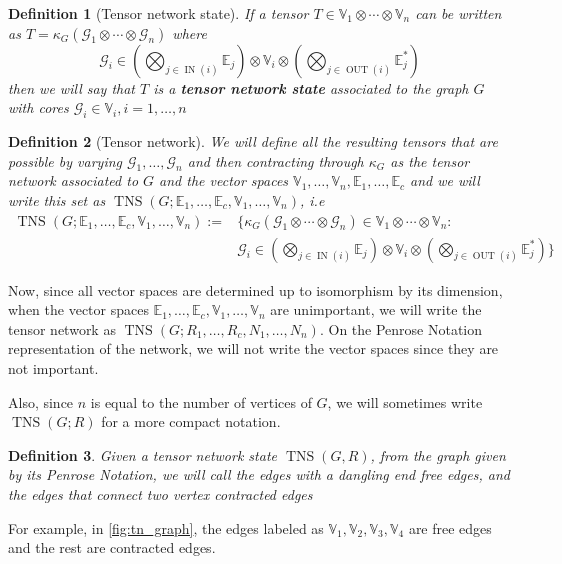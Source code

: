 \documentclass[11pt,a4paper,openright,oneside]{book}
\numberwithin{equation}{section}
\newtheorem{defn0}{Definition}[chapter]
\newenvironment{definition}{ \begin{defn0}}{\end{defn0}}
\newcommand{\figref}[1]{\cref{#1}}
\DeclareMathOperator{\IN}{IN}
\DeclareMathOperator{\OUT}{OUT}
\DeclareMathOperator{\TNS}{TNS}
\begin{document}
\begin{definition}[Tensor network state]
    If a tensor $T \in \mathbb{V}_1 \otimes \cdots \otimes \mathbb{V}_n$ can be written as $T = \kappa_G(\mathcal{G}_1 \otimes \cdots \otimes \mathcal{G}_n)$ where
    $$\mathcal{G}_i \in \left( \bigotimes\nolimits_{j \in \IN (i)} \mathbb{E}_j \right) \otimes \mathbb{V}_i \otimes 
\left( \bigotimes\nolimits_{j \in \OUT (i)} \mathbb{E}_j^*  \right)$$
then we will say that $T$ is a \textbf{tensor network state} associated to the graph $G$ with cores $\mathcal{G}_i \in \mathbb{V}_i, i = 1, \dots, n$
\end{definition}

\begin{definition}[Tensor network]
    We will define all the resulting tensors that are possible by varying $\mathcal{G}_1, \dots, \mathcal{G}_n$ and then contracting through $\kappa_G$ as the tensor network
associated to $G$ and the vector spaces $\mathbb{V}_1, \dots, \mathbb{V}_n, \mathbb{E}_1, \dots, \mathbb{E}_c$ and we will write this set
as $\TNS(G; \mathbb{E}_1, \dots, \mathbb{E}_c, \mathbb{V}_1, \dots, \mathbb{V}_n)$, i.e
$$
\begin{align}
    \TNS(G; \mathbb{E}_1, \dots, \mathbb{E}_c, \mathbb{V}_1, \dots, \mathbb{V}_n) := & \Bigg\{ \kappa_G(\mathcal{G}_1 \otimes \cdots \otimes \mathcal{G}_n) \in \mathbb{V}_1 \otimes \cdots \otimes \mathbb{V}_n : \\
                                                                                     & \mathcal{G}_i \in \left( \bigotimes\nolimits_{j \in \IN (i)} \mathbb{E}_j \right) \otimes \mathbb{V}_i \otimes 
\left( \bigotimes\nolimits_{j \in \OUT (i)} \mathbb{E}_j^*  \right) \Bigg\}
\end{align}
$$
\end{definition}
Now, since all vector spaces are determined up to isomorphism by its dimension, when the vector spaces $\mathbb{E}_1, \dots, \mathbb{E}_c, \mathbb{V}_1, \dots, \mathbb{V}_n$ are unimportant,
we will write the tensor network as $\TNS(G; R_1, \dots, R_c, N_1, \dots, N_n)$. On the Penrose
Notation representation of the network, we will not write the vector spaces since they are
not important.

Also, since $n$ is equal to the number of vertices of $G$, we will sometimes write $\TNS(G; R)$ for a more compact notation.

\begin{definition}
    Given a tensor network state $\TNS(G, R)$, from the graph given by its Penrose Notation,
    we will call the edges with a dangling end \textit{free edges}, and the edges that connect two vertex \textit{contracted edges}
\end{definition}
For example, in \figref{fig:tn_graph}, the edges labeled as $\mathbb{V}_1, \mathbb{V}_2, \mathbb{V}_3, \mathbb{V}_4$ are 
free edges and the rest are contracted edges.
\end{document}
